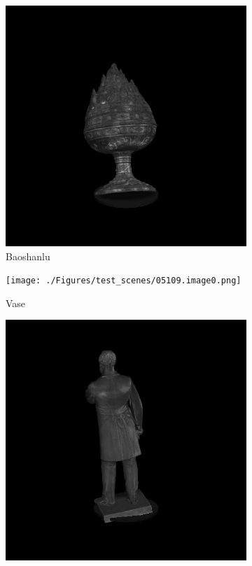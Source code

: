 \documentclass[border=15pt, multi, tikz]{article}
\begin{document}
\begin{figure}[H]
	
	\begin{subfigure}[b]{0.18\linewidth}
		\includegraphics[width=\linewidth]{./Figures/test_scenes/05051.image0.png}
		\caption{Baoshanlu}
	\end{subfigure}
	\begin{subfigure}[b]{0.18\linewidth}
		\texttt{[image: ./Figures/test\_scenes/05109.image0.png]}
		\caption{Vase}
	\end{subfigure}
	\begin{subfigure}[b]{0.18\linewidth}
		\includegraphics[width=\linewidth]{./Figures/test_scenes/05111.image0.png}

\end{subfigure}
\end{figure}
\end{document}
